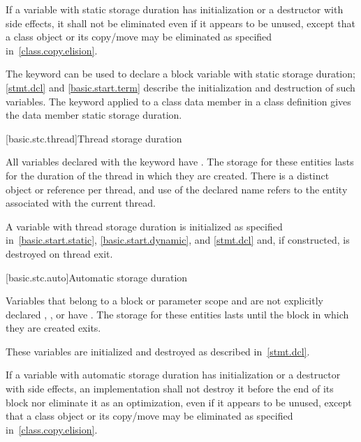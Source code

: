 \pnum
If a variable with static storage duration has initialization or a
destructor with side effects, it shall not be eliminated even if it
appears to be unused, except that a class object or its copy/move may be
eliminated as specified in~\ref{class.copy.elision}.

\pnum
\begin{note}
%
The keyword  can be used to declare
a block variable with static storage duration;
\ref{stmt.dcl} and \ref{basic.start.term} describe the
initialization and destruction of such variables.
%
The keyword  applied to
a class data member in a class definition
gives the data member static storage duration.
\end{note}

[basic.stc.thread]{Thread storage duration}

\pnum
All variables declared with the  keyword have
.
The storage for these entities lasts for the duration of
the thread in which they are created. There is a distinct object or reference
per thread, and use of the declared name refers to the entity associated with
the current thread.

\pnum
\begin{note}
A variable with thread storage duration is initialized as specified
in~\ref{basic.start.static}, \ref{basic.start.dynamic}, and \ref{stmt.dcl}
and, if constructed, is destroyed on thread exit.
\end{note}

[basic.stc.auto]{Automatic storage duration}

\pnum
{}%
Variables that belong to a block or parameter scope and are
not explicitly declared , , or  have
. The storage
for these entities lasts until the block in which they are created exits.

\pnum
\begin{note}
These variables are initialized and destroyed as described in~\ref{stmt.dcl}.
\end{note}

\pnum
If a variable with automatic storage duration has initialization or a destructor with side
effects, an implementation shall not destroy it before the end of its block
nor eliminate it as an optimization, even if it appears to be
unused, except that a class object or its copy/move may be eliminated as
specified in~\ref{class.copy.elision}.

